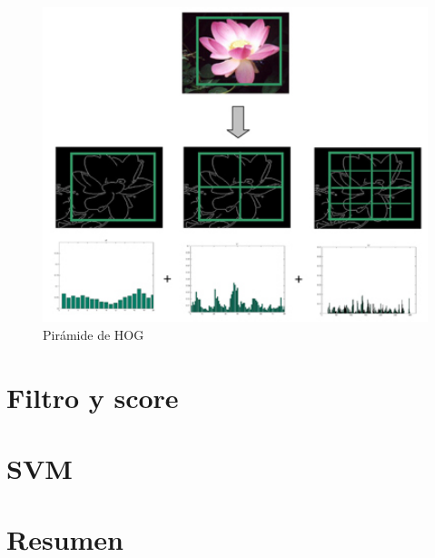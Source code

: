 \begin{figure}[tb]
  \centering
   \includegraphics[width=1\textwidth]{Figuras/phog.jpg}
   \caption{Pirámide de HOG~\cite{pyra}}
   \label{fig:hog_pyra}
\end{figure}

\section{Filtro y score}\label{sec:fas}


\section{SVM}\label{sec:svm}


\section{Resumen}\label{sec:resumen}

